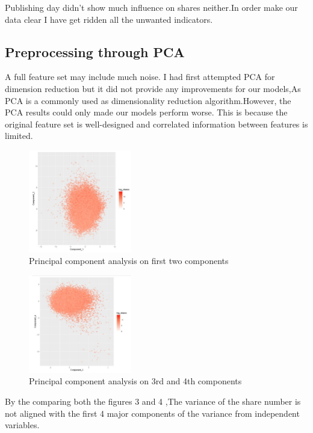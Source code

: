 \documentclass[sigchi]{acmart}
\begin{document}
Publishing day didn't show much influence on shares neither.In order make our data clear I have get ridden all the unwanted indicators. 


\subsection{Preprocessing through PCA}
A full feature set may include much noise. I had first attempted PCA for dimension reduction but it did not provide any improvements for our models,As PCA is a commonly used as dimensionality reduction algorithm\cite{Li}.However, the PCA results could only made our models perform worse. This is because the original feature set is well-designed and correlated information between features is limited.

\begin{figure}[h!]
    \caption{Principal component analysis on first two components}
    \centering
    \includegraphics[width=0.4\textwidth]{PCA_12.JPG}
\end{figure}


\begin{figure}[h!]
    \caption{Principal component analysis on 3rd and 4th components}
    \centering
    \includegraphics[width=0.4\textwidth]{PCA_34.JPG}
\end{figure}

By the comparing both the figures 3 and 4 ,The variance of the share number is not aligned with the first 4 major components of the variance from independent variables.
\end{document}
